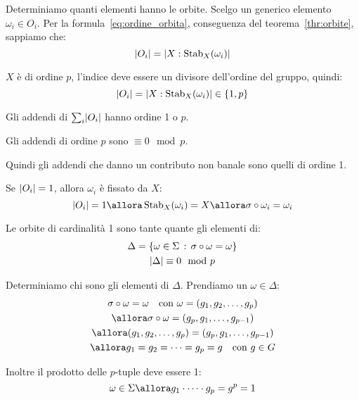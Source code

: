 \begin{dimostrazione}
    Determiniamo quanti elementi hanno le orbite.
    Scelgo un generico elemento $\omega_i \in O_i$.
    Per la formula~\eqref{eq:ordine_orbita}, conseguenza del teorema~\ref{thr:orbite}, sappiamo che:
    \begin{equation*}
        \lvert O_i \rvert = \lvert X:\operatorname{Stab}_X(\omega_i) \rvert
    \end{equation*}

    $X$ è di ordine $p$, l'indice deve essere un divisore dell'ordine del gruppo, quindi:
    \begin{equation*}
        \lvert O_i \rvert = \lvert X:\operatorname{Stab}_X(\omega_i) \rvert \in \{1, p\}
    \end{equation*}

    Gli addendi di $\sum_i \lvert O_i \rvert$ hanno ordine 1 o $p$.

    Gli addendi di ordine $p$ sono $\equiv 0 \mod p$.

    Quindi gli addendi che danno un contributo non banale sono quelli di ordine 1.

    Se $\lvert O_i \rvert = 1$, allora $\omega_i$ è fissato da $X$:
    \begin{equation*}
        \ordine{O_i} = 1 \allora \Stab_{X}(\omega_i) = X \allora \sigma \circ \omega_i = \omega_i
    \end{equation*}

    Le orbite di cardinalità 1 sono tante quante gli elementi di:
    \begin{gather*}
        \Delta = \{\omega \in \Sigma \,:\, \sigma \circ \omega = \omega\} \\
        \lvert \Delta \rvert \equiv 0 \mod p
    \end{gather*}

    Determiniamo chi sono gli elementi di $\Delta$.
    Prendiamo un $\omega \in \Delta$:
    \begin{gather*}
        \sigma \circ \omega = \omega \quad \text{con } \omega = (g_1, g_2, \dots, g_p) \\
        \allora \sigma \circ \omega = (g_p, g_1, \dots, g_{p-1}) \\
        \allora (g_1, g_2, \dots, g_p) = (g_p, g_1, \dots, g_{p-1}) \\
        \allora g_1 = g_2 = \dots = g_p = g \quad \text{con } g \in G
    \end{gather*}

    Inoltre il prodotto delle $p$-tuple deve essere 1:
    \begin{equation*}
        \omega \in \Sigma \allora g_1 \cdot \dots \cdot g_p = g^p = 1
    \end{equation*}


\end{dimostrazione}
